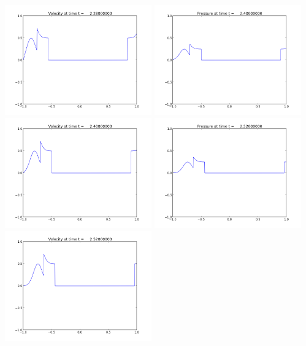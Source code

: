 \documentclass[11pt]{article}
\begin{document}
\includegraphics[width=0.475\textwidth]{frame0019fig2.png}
\vskip 10pt 
\includegraphics[width=0.475\textwidth]{frame0020fig1.png}
\includegraphics[width=0.475\textwidth]{frame0020fig2.png}
\vskip 10pt 
\includegraphics[width=0.475\textwidth]{frame0021fig1.png}
\includegraphics[width=0.475\textwidth]{frame0021fig2.png}
\end{document}
